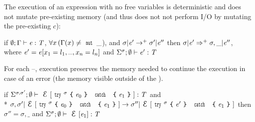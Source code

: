 The execution of an expression
with no \Q@mut@ free variables is deterministic and does not
mutate pre-existing memory (and thus does not not perform I/O by mutating the pre-existing $c$):\saveSpace\saveSpace
\begin{Assumption}[Determinism]\rm
	if $\emptyset;\Gamma\vdash {\ensuremath{\mathit{e}}}:{\mathit{T}}$, 
	$\forall x\, ( \Gamma(x)\neq\Kw{mut}\,\_$), and
	$\sigma | {\mathit{e}}'\rightarrow^+ \sigma' | {\mathit{e}}''$
	then 
	$\sigma | {\mathit{e}}'\Rightarrow^+ \sigma,\_ | {\mathit{e}}''$,
	where $\e'=\e[x_1=l_1,\ldots,x_n=l_n]$ and $\Sigma^\sigma;\emptyset\vdash {\ensuremath{\mathit{e}}}':{\mathit{T}}$
\end{Assumption}

For each \Q@try@--\Q@catch@, execution preserves the memory needed to continue the execution in case of an error (the memory visible outside of the \Q@try@).\saveSpace\saveSpace
\begin{Assumption}\rm
	if $\Sigma^{\sigma,\sigma'};\emptyset\vdash \ctx[\Kw{try}^\sigma\oC\e_0\cC\ \Kw{catch}\ \oC\e_1\cC]:\T$
	and\\*
	$
	\sigma,\sigma'|\ctx[\Kw{try}^\sigma\oC\e_0\cC\ \Kw{catch}\ \oC\e_1\cC]\rightarrow 
	\sigma''|\ctx[\Kw{try}^\sigma\oC\e'\cC\ \Kw{catch}\ \oC\e_1\cC]
	$
	then 
	$\sigma''=\sigma,\_$
	and
	$\Sigma^\sigma;\emptyset\vdash \ctx[\e_1]:\T$
\end{Assumption}







